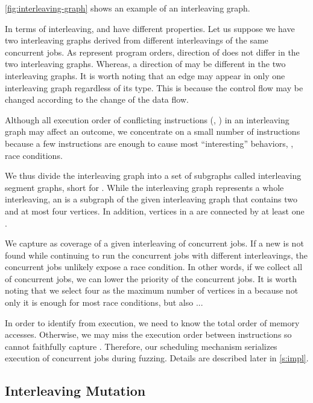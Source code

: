 \autoref{fig:interleaving-graph} shows an example of an interleaving
graph.
%


%
In terms of interleaving, \immutables and \mutables have different
properties. Let us suppose we have two interleaving graphs derived
from different interleavings of the same concurrent jobs.
%
As \immutables represent program orders, direction of \immutables does
not differ in the two interleaving graphs.
%
Whereas, a direction of \mutables may be different in the two
interleaving graphs.
%
It is worth noting that an edge may appear in only one interleaving
graph regardless of its type. This is because the control flow may be
changed according to the change of the data flow.


%
Although all execution order of conflicting instructions (\ie,
\mutables) in an interleaving graph may affect an outcome, we
concentrate on a small number of instructions because a few
instructions are enough to cause most ``interesting'' behaviors, \ie,
race conditions.

%
We thus divide the interleaving graph into a set of subgraphs called
interleaving segment graphs, short for \segments.
%
While the interleaving graph represents a whole interleaving, an
\segment is a subgraph of the given interleaving graph that contains
two \mutables and at most four vertices. In addition, vertices in a
\segment are connected by at least one \mutable.

We capture \segments as coverage of a given interleaving of concurrent
jobs.
%
If a new \segment is not found while continuing to run the concurrent
jobs with different interleavings, the concurrent jobs unlikely expose
a race condition. In other words, if we collect all \segments of
concurrent jobs, we can lower the priority of the concurrent jobs.
%
It is worth noting that we select four as the maximum number of
vertices in a \segment because not only it is enough for most race
conditions, but also \dr{}...

In order to identify \segments from execution, we need to know the
total order of memory accesses. Otherwise, we may miss the execution
order between instructions so cannot faithfully capture \segments.
%
Therefore, our scheduling mechanism serializes execution of concurrent
jobs during fuzzing. Details are described later in \autoref{s:impl}.


\subsection{Interleaving Mutation}
\label{ss:scheduler}


